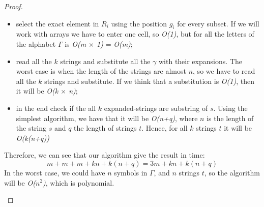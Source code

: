 \documentclass[paper=a4, fontsize=11pt]{scrartcl}
\numberwithin{equation}{section}		%
\numberwithin{figure}{section}			%
\numberwithin{table}{section}				%
\begin{document}
\begin{proof}
\begin{enumerate}
\begin{itemize}
	        	\item select the exact element in $R_i$ using the position $g_i$ for every subset. If we will work with arrays we have to enter one cell, so \textit{O(1)}, but for all the letters of the alphabet $\Gamma$ is \textit{O(m $\times$ 1)} = \textit{O(m)};
	        	\item read all the $k$ strings and substitute all the $\gamma$ with their expansions. The worst case is when the length of the strings are almost $n$, so we have to read all the $k$ strings and substitute. If we think that a substitution is \textit{O(1)}, then it will be \textit{O(k $\times$ n)};
	        	\item in the end check if the all $k$ expanded-strings are substring of $s$. Using the simplest algorithm, we have that it will be \textit{O(n+q)}, where $n$ is the length of the string $s$ and $q$ the length of strings $t$. Hence, for all $k$ strings $t$ it will be \textit{O(k(n+q))}
	        \end{itemize}
        Therefore, we can see that our algorithm give the result in time:
        $$m+m+m+kn+k(n+q) = 3m+kn+k(n+q) $$
        In the worst case, we could have $n$ symbols in $\mathcal{\Gamma}$, and $n$ strings $t$, so the algorithm will be \textit{O($n^2$)}, which is polynomial.          
\end{enumerate}
\end{proof}
\end{document}
